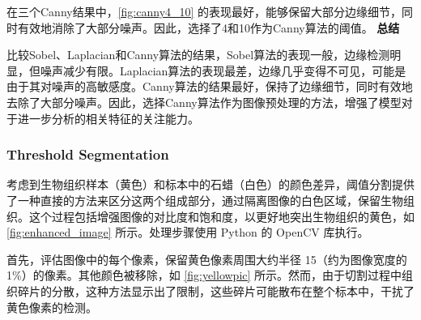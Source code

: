 在三个Canny结果中，\autoref{fig:canny4_10} 的表现最好，能够保留大部分边缘细节，同时有效地消除了大部分噪声。因此，选择了4和10作为Canny算法的阈值。
\textbf{总结}

比较Sobel、Laplacian和Canny算法的结果，Sobel算法的表现一般，边缘检测明显，但噪声减少有限。Laplacian算法的表现最差，边缘几乎变得不可见，可能是由于其对噪声的高敏感度。Canny算法的结果最好，保持了边缘细节，同时有效地去除了大部分噪声。因此，选择Canny算法作为图像预处理的方法，增强了模型对于进一步分析的相关特征的关注能力。

\subsubsection{Threshold Segmentation}
考虑到生物组织样本（黄色）和标本中的石蜡（白色）的颜色差异，阈值分割提供了一种直接的方法来区分这两个组成部分，通过隔离图像的白色区域，保留生物组织。这个过程包括增强图像的对比度和饱和度，以更好地突出生物组织的黄色，如 \autoref{fig:enhanced_image} 所示。处理步骤使用 Python 的 OpenCV 库执行。

首先，评估图像中的每个像素，保留黄色像素周围大约半径 15（约为图像宽度的 1\%）的像素。其他颜色被移除，如 \autoref{fig:yellowpic} 所示。然而，由于切割过程中组织碎片的分散，这种方法显示出了限制，这些碎片可能散布在整个标本中，干扰了黄色像素的检测。

